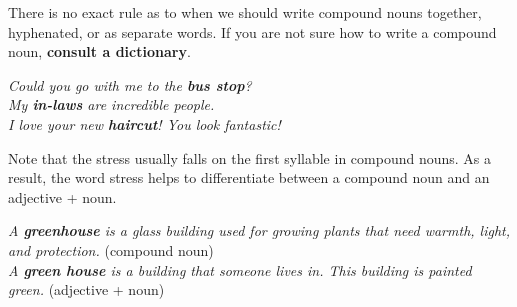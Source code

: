 \documentclass[hidelinks,10pt,a4paper]{article}
\begin{document}
There is no exact rule as to when we should write compound nouns together, hyphenated, or as separate words. If you are not sure how to write a compound noun, \textbf{consult a dictionary}.
\begin{center}
\textit{
		Could you go with me to the \textbf{bus stop}?\\
		My \textbf{in-laws} are incredible people.\\
I love your new \textbf{haircut}! You look fantastic!}
\end{center}
Note that the stress usually falls on the first syllable in compound nouns. As a result, the word stress helps to differentiate between a compound noun and an adjective + noun.
\begin{center}
\textit{
A \textbf{greenhouse} is a glass building used for growing plants that need warmth, light, and protection.} (compound noun)\\
\textit{
A \textbf{green house} is a building that someone lives in. This building is painted green.} (adjective + noun)
\end{center}

\newpage
\end{document}
